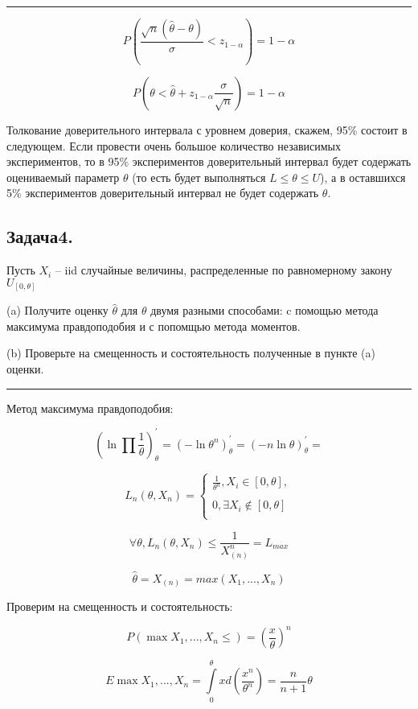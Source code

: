 \documentclass[8pt,reqno]{article}
\theoremstyle{definition}
\theoremstyle{remark}
\newcommand{\lfrac} [2] {\displaystyle \frac{#1}{#2}}
\begin{document}
\noindent\rule{8cm}{0.4pt}

$$
P\left(\frac{\sqrt{n}\left(\widehat{\theta} - \theta\right)}{\sigma} < z_{1-\alpha}\right) = 1 - \alpha
$$


$$
P\left(\theta < \widehat{\theta} + z_{1-\alpha}\frac{\sigma}{\sqrt{n}}\right) = 1 - \alpha
$$

Толкование доверительного интервала с уровнем доверия, скажем, 95\% состоит в следующем. Если провести очень большое количество независимых экспериментов, то в 95\% экспериментов доверительный интервал будет содержать оцениваемый параметр $\theta$ (то есть будет выполняться $L \leq \theta \leq U$), а в оставшихся 5\% экспериментов доверительный интервал не будет содержать $\theta$.

\subsection*{Задача4.}

Пусть $X_i$ – iid случайные величины, распределенные по равномерному закону $U_{[0,\theta]}$

(a) Получите оценку $\widehat{\theta}$ для $\theta$ двумя разными способами: c помощью метода максимума правдоподобия
и с попомщью метода моментов.

(b) Проверьте на смещенность и состоятельность полученные в пункте (a) оценки.

\noindent\rule{8cm}{0.4pt}

Метод максимума правдоподобия:

$$
\left(\ln{\prod \frac{1}{\theta}} \right)^{'}_{\theta} = \left(-\ln{\theta^n} \right)^{'}_{\theta} = \left(-n\ln{\theta} \right)^{'}_{\theta} =
$$

$$
L_n(\theta, X_n) = \left\{\begin{array}{rcl}
\lfrac{1}{\theta^n}, X_i \in [0,\theta], \\
\\
0, \exists X_i \notin  [0,\theta] \\
\end{array}\right.
$$


$$
\forall \theta, L_n (\theta, X_n) \leq \lfrac{1}{X^n_{(n)}} = L_{max}
$$

$$
\widehat{\theta} = X_{(n)} = max(X_1,...,X_n)
$$

Проверим на смещенность и состоятельность:

$$
P\left(\max{X_1,...,X_n} \leq \right) = \left(\lfrac{x}{\theta}\right)^n
$$

$$
E\max{X_1,...,X_n} = \int\limits_0^{\theta} x d\left(\lfrac{x^n}{\theta^n}\right) = \lfrac{n}{n+1} \theta
$$
\end{document}
